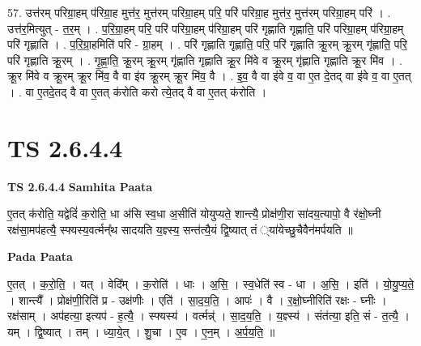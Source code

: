 \documentclass[17pt]{extarticle}
\begin{document}
57. उत्त॑रम् परिग्रा॒हम् प॑रिग्रा॒ह मुत्त॑र॒ मुत्त॑रम् परिग्रा॒हम् परि॒ परि॑ परिग्रा॒ह मुत्त॑र॒ मुत्त॑रम् परिग्रा॒हम् परि॑ । . उत्त॑र॒मित्युत् - त॒र॒म् । . प॒रि॒ग्रा॒हम् परि॒ परि॑ परिग्रा॒हम् प॑रिग्रा॒हम् परि॑ गृह्णाति गृह्णाति॒ परि॑ परिग्रा॒हम् प॑रिग्रा॒हम् परि॑ गृह्णाति । . प॒रि॒ग्रा॒हमिति॑ परि - ग्रा॒हम् । . परि॑ गृह्णाति गृह्णाति॒ परि॒ परि॑ गृह्णाति क्रू॒रम् क्रू॒रम् गृ॑ह्णाति॒ परि॒ परि॑ गृह्णाति क्रू॒रम् । . गृ॒ह्णा॒ति॒ क्रू॒रम् क्रू॒रम् गृ॑ह्णाति गृह्णाति क्रू॒र मि॑वे व क्रू॒रम् गृ॑ह्णाति गृह्णाति क्रू॒र मि॑व । . क्रू॒र मि॑वे व क्रू॒रम् क्रू॒र मि॑व॒ वै वा इ॑व क्रू॒रम् क्रू॒र मि॑व॒ वै । . इ॒व॒ वै वा इ॑वे व॒ वा ए॒त दे॒तद् वा इ॑वे व॒ वा ए॒तत् । . वा ए॒तदे॒तद् वै वा ए॒तत् क॑रोति करो त्ये॒तद् वै वा ए॒तत् क॑रोति । \newline
\pagebreak
{}
\section*{ TS 2.6.4.4 }

\textbf{TS 2.6.4.4 } \newline
\textbf{Samhita Paata} \newline

ए॒तत् क॑रोति॒ यद्वेदिं॑ क॒रोति॒ धा अ॑सि स्व॒धा अ॒सीति॑ योयुप्यते॒ शान्त्यै॒ प्रोक्ष॑णी॒रा सा॑दय॒त्यापो॒ वै र॑क्षो॒घ्नी रक्ष॑सा॒मप॑हत्यै॒ स्फ्यस्य॒वर्त्मन्᳚थ सादयति य॒ज्ञ्स्य॒ सन्त॑त्यै॒यं द्वि॒ष्यात् तं \ध्या॑येच्छु॒चैवैन॑मर्पयति ॥ \newline

\textbf{Pada Paata} \newline

ए॒तत् । क॒रो॒ति॒ । यत् । वेदि᳚म् । क॒रोति॑ । धाः । अ॒सि॒ । स्व॒धेति॑ स्व - धा । अ॒सि॒ । इति॑ । यो॒यु॒प्य॒ते॒ । शान्त्यै᳚ । प्रोक्ष॑णी॒रिति॑ प्र - उक्ष॑णीः । एति॑ । सा॒द॒य॒ति॒ । आपः॑ । वै । र॒क्षो॒घ्नीरिति॑ रक्षः - घ्नीः । रक्ष॑साम् । अप॑हत्या॒ इत्यप॑ - ह॒त्यै॒ । स्फ्यस्य॑ । वर्त्मन्न्॑ । सा॒द॒य॒ति॒ । य॒ज्ञ्स्य॑ । संत॑त्या॒ इति॒ सं - त॒त्यै॒ । यम् । द्वि॒ष्यात् । तम् । ध्या॒ये॒त् । शु॒चा । ए॒व । ए॒न॒म् । अ॒र्प॒य॒ति॒ ॥  \newline
\end{document}

